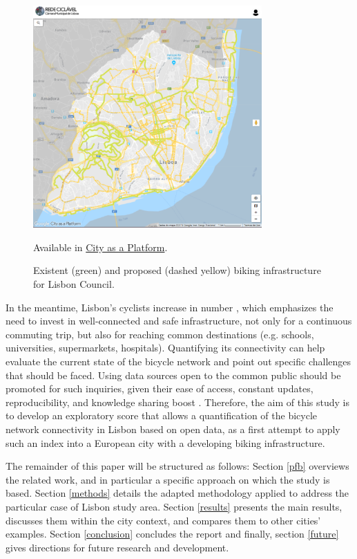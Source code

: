 \documentclass[information,article,submit,moreauthors,pdftex,10pt,a4paper]{mdpi}
\theoremstyle{mdpi}
\newcounter{ex}
\newcounter{re}
\theoremstyle{mdpidefinition}
\begin{document}
\begin{figure}[ht]
	\begin{center}
		\includegraphics[height=8.5cm]{fig1}
		\caption{Existent (green) and proposed (dashed yellow) biking infrastructure for Lisbon Council.} Available in \protect\href{https://lisboa.city-platform.com/app/?a=redeciclavel}{City as a Platform}.
		\label{fig1}
	\end{center}
\end{figure}

In the meantime, Lisbon's cyclists increase in number \cite{Baratto2016LisboaCiclistas}, which emphasizes the need to invest in well-connected and safe infrastructure, not only for a continuous commuting trip, but also for reaching common destinations (e.g. schools, universities, supermarkets, hospitals). Quantifying its connectivity can help evaluate the current state of the bicycle network and point out specific challenges that should be faced. Using data sources open to the common public should be promoted for such inquiries, given their ease of access, constant updates, reproducibility, and knowledge sharing boost \cite{opendatahandbook,EuropeanDataPortal2018BenefitsData}. Therefore, the aim of this study is to develop an exploratory score that allows a quantification of the bicycle network connectivity in Lisbon based on open data, as a first attempt to apply such an index into a European city with a developing biking infrastructure.

The remainder of this paper will be structured as follows: Section \ref{pfb} overviews the related work, and in particular a specific approach on which the study is based. Section \ref{methods} details the adapted methodology applied to address the particular case of Lisbon study area. Section \ref{results} presents the main results, discusses them within the city context, and compares them to other cities' examples. Section \ref{conclusion} concludes the report and finally, section \ref{future} gives directions for future research and development.
\end{document}
